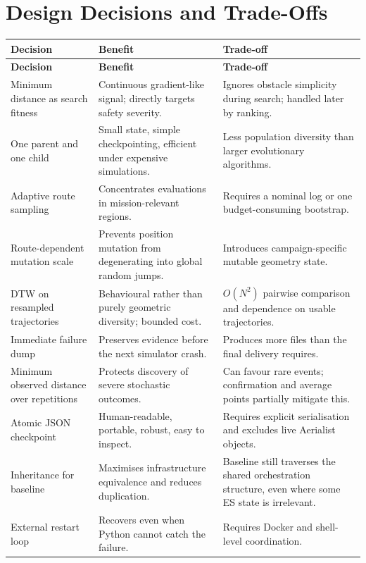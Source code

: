 \documentclass[11pt,a4paper]{report}
\begin{document}
\section{Design Decisions and Trade-Offs}
\begin{longtable}{L{4cm} L{5.2cm} L{5.2cm}}
\toprule
\textbf{Decision} & \textbf{Benefit} & \textbf{Trade-off}\\
\midrule
\endfirsthead
\toprule
\textbf{Decision} & \textbf{Benefit} & \textbf{Trade-off}\\
\midrule
\endhead
Minimum distance as search fitness & Continuous gradient-like signal; directly targets safety severity. & Ignores obstacle simplicity during search; handled later by ranking.\\
One parent and one child & Small state, simple checkpointing, efficient under expensive simulations. & Less population diversity than larger evolutionary algorithms.\\
Adaptive route sampling & Concentrates evaluations in mission-relevant regions. & Requires a nominal log or one budget-consuming bootstrap.\\
Route-dependent mutation scale & Prevents position mutation from degenerating into global random jumps. & Introduces campaign-specific mutable geometry state.\\
DTW on resampled trajectories & Behavioural rather than purely geometric diversity; bounded cost. & $O(N^2)$ pairwise comparison and dependence on usable trajectories.\\
Immediate failure dump & Preserves evidence before the next simulator crash. & Produces more files than the final delivery requires.\\
Minimum observed distance over repetitions & Protects discovery of severe stochastic outcomes. & Can favour rare events; confirmation and average points partially mitigate this.\\
Atomic JSON checkpoint & Human-readable, portable, robust, easy to inspect. & Requires explicit serialisation and excludes live Aerialist objects.\\
Inheritance for baseline & Maximises infrastructure equivalence and reduces duplication. & Baseline still traverses the shared orchestration structure, even where some ES state is irrelevant.\\
External restart loop & Recovers even when Python cannot catch the failure. & Requires Docker and shell-level coordination.\\
\bottomrule
\end{longtable}
\end{document}
